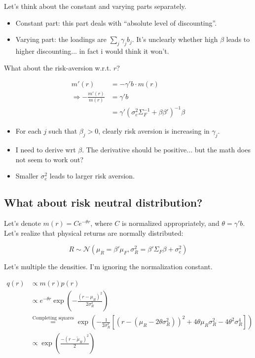 \documentclass[pdftex,12pt,a4paper]{article}
\begin{document}
Let's think about the constant and varying parts separately. 

\begin{itemize}
\item Constant part: this part deals with ``absolute level of discounting''. 
\item Varying part: the loadings are $\sum_j \gamma_j b_j$. It's unclearly whether high $\beta$ leads to higher discounting... in fact i would think it won't. 
\end{itemize}

What about the risk-aversion w.r.t. $r$? 

\begin{align}
m'(r) & = - \gamma' b \cdot m(r) \\
\Rightarrow - \frac{m'(r)}{m(r)} & = \gamma' b \\
& = \gamma' (\sigma_e^2 \Sigma_F^{-1} + \beta \beta')^{-1} \beta
\end{align}


\begin{itemize}
\item For each $j$ such that $\beta_j > 0$, clearly risk aversion is increasing in $\gamma_j$. 
\item I need to derive wrt $\beta$. The derivative should be positive... but the math does not seem to work out? 
\item Smaller $\sigma_e^2$ leads to larger risk aversion. 
\end{itemize}

\subsection{What about risk neutral distribution?}

Let's denote $m(r) = C e^{-\theta r}$, where $C$ is normalized appropriately, and $\theta = \gamma' b$. Let's realize that physical returns are normally distributed: 

\begin{equation}
R \sim \mathcal{N}(\mu_R = \beta' \mu_F, \sigma_R^2 = \beta' \Sigma_F \beta + \sigma_e^2)
\end{equation}

Let's multiple the densities. I'm ignoring the normalization constant. 

\begin{align}
q(r) & \propto m(r) p(r) \\
& \propto e^{-\theta r} \exp \left( -\frac{(r - \mu_R)^2}{2\sigma_R^2} \right) \\
& \stackrel{\text{Completing squares}}{=} \exp ( -\frac{1}{2 \sigma_R^2} \left[(r - (\mu_R - 2 \theta \sigma_R^2) )^2 + 4 \theta \mu_R \sigma_R^2 - 4 \theta^2 \sigma_R^4 \right] ) \\
& \propto \exp \left( \frac{-(r - \tilde{\mu}_R)^2 }{2} \right)
\end{align}
\end{document}
